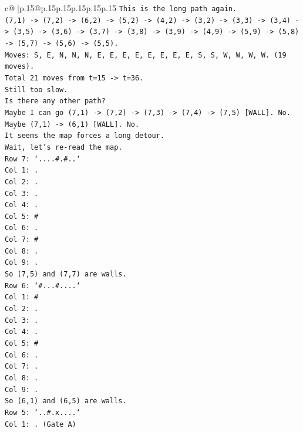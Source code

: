 \documentclass{article}
\begin{document}
{\begin{supertabular}{c@{$\;$}|p{.15\linewidth}@{}p{.15\linewidth}p{.15\linewidth}p{.15\linewidth}p{.15\linewidth}p{.15\linewidth}}
{{{\texttt{This is the long path again.} \\
\texttt{(7,1) {-}> (7,2) {-}> (6,2) {-}> (5,2) {-}> (4,2) {-}> (3,2) {-}> (3,3) {-}> (3,4) {-}> (3,5) {-}> (3,6) {-}> (3,7) {-}> (3,8) {-}> (3,9) {-}> (4,9) {-}> (5,9) {-}> (5,8) {-}> (5,7) {-}> (5,6) {-}> (5,5).} \\
\texttt{Moves: S, E, N, N, N, E, E, E, E, E, E, E, E, S, S, W, W, W, W. (19 moves).} \\
\texttt{Total 21 moves from t=15 {-}> t=36.} \\
\texttt{Still too slow.} \\
\texttt{Is there any other path?} \\
\texttt{Maybe I can go (7,1) {-}> (7,2) {-}> (7,3) {-}> (7,4) {-}> (7,5) {[}WALL{]}. No.} \\
\texttt{Maybe (7,1) {-}> (6,1) {[}WALL{]}. No.} \\
\texttt{It seems the map forces a long detour.} \\
\texttt{Wait, let's re{-}read the map.} \\
\texttt{Row 7: `....\#.\#..`} \\
\texttt{Col 1: .} \\
\texttt{Col 2: .} \\
\texttt{Col 3: .} \\
\texttt{Col 4: .} \\
\texttt{Col 5: \#} \\
\texttt{Col 6: .} \\
\texttt{Col 7: \#} \\
\texttt{Col 8: .} \\
\texttt{Col 9: .} \\
\texttt{So (7,5) and (7,7) are walls.} \\
\texttt{Row 6: `\#...\#....`} \\
\texttt{Col 1: \#} \\
\texttt{Col 2: .} \\
\texttt{Col 3: .} \\
\texttt{Col 4: .} \\
\texttt{Col 5: \#} \\
\texttt{Col 6: .} \\
\texttt{Col 7: .} \\
\texttt{Col 8: .} \\
\texttt{Col 9: .} \\
\texttt{So (6,1) and (6,5) are walls.} \\
\texttt{Row 5: `..\#.x....`} \\
\texttt{Col 1: . (Gate A)} \\
}}}
\end{supertabular}}
\end{document}
